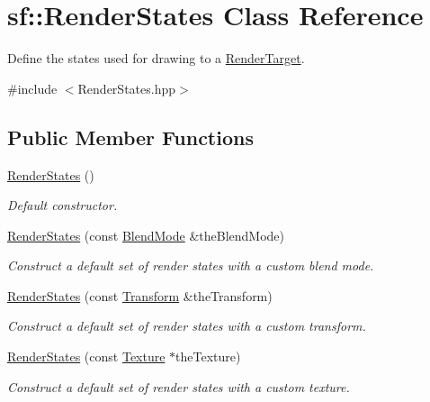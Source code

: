 \hypertarget{classsf_1_1_render_states}{}\section{sf\+:\+:Render\+States Class Reference}
\label{classsf_1_1_render_states}


Define the states used for drawing to a \mbox{\hyperlink{classsf_1_1_render_target}{Render\+Target}}.  




{\ttfamily \#include $<$Render\+States.\+hpp$>$}

\subsection*{Public Member Functions}
\begin{DoxyCompactItemize}
\item 
\mbox{\hyperlink{classsf_1_1_render_states_a885bf14070d0d5391f062f62b270b7d0}{Render\+States}} ()
\begin{DoxyCompactList}\small\item\em Default constructor. \end{DoxyCompactList}\item 
\mbox{\hyperlink{classsf_1_1_render_states_acac8830a593c8a4523ac2fdf3cac8a01}{Render\+States}} (const \mbox{\hyperlink{structsf_1_1_blend_mode}{Blend\+Mode}} \&the\+Blend\+Mode)
\begin{DoxyCompactList}\small\item\em Construct a default set of render states with a custom blend mode. \end{DoxyCompactList}\item 
\mbox{\hyperlink{classsf_1_1_render_states_a3e99cad6ab05971d40357949930ed890}{Render\+States}} (const \mbox{\hyperlink{classsf_1_1_transform}{Transform}} \&the\+Transform)
\begin{DoxyCompactList}\small\item\em Construct a default set of render states with a custom transform. \end{DoxyCompactList}\item 
\mbox{\hyperlink{classsf_1_1_render_states_a8f4ca3be0e27dafea0c4ab8547439bb1}{Render\+States}} (const \mbox{\hyperlink{classsf_1_1_texture}{Texture}} $\ast$the\+Texture)
\begin{DoxyCompactList}\small\item\em Construct a default set of render states with a custom texture. \end{DoxyCompactList}\item 

\end{DoxyCompactItemize}
